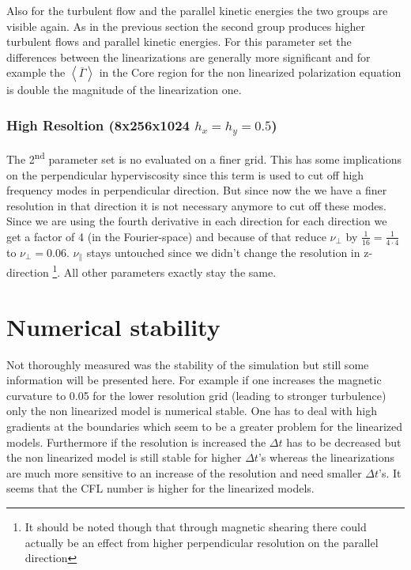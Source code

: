 \documentclass[master.tex]{subfiles}
\begin{document}
Also for the turbulent flow and the parallel kinetic energies the two groups are visible again. As in the previous section the second group produces higher turbulent flows and parallel kinetic energies.\newline
For this parameter set the differences between the linearizations are generally more significant and for example the $\left< \overline{\Gamma} \right>$ in the Core region for the non linearized polarization equation is double the magnitude of the linearization one.

\subsubsection{High Resoltion (8x256x1024 $h_x = h_y = 0.5$)}
The 2\textsuperscript{nd} parameter set is no evaluated on a finer grid. This has some implications on the perpendicular hyperviscosity since this term is used to cut off high frequency modes in perpendicular direction. But since now the we have a finer resolution in that direction it is not necessary anymore to cut off these modes. Since we are using the fourth derivative in each direction for each direction we get a factor of 4 (in the Fourier-space) and because of that reduce $\nu_\perp$ by $\frac{1}{16} = \frac{1}{4\cdot4}$ to $\nu_\perp = 0.06$. $\nu_\parallel$ stays untouched since we didn't change the resolution in z-direction \footnote{It should be noted though that through magnetic shearing there could actually be an effect from higher perpendicular resolution on the parallel direction}. All other parameters exactly stay the same.



\section{Numerical stability}
Not thoroughly measured was the stability of the simulation but still some information will be presented here. For example if one increases the magnetic curvature to 0.05 for the lower resolution grid (leading to stronger turbulence) only the non linearized model is numerical stable. One has to deal with high gradients at the boundaries which seem to be a greater problem for the linearized models. 
Furthermore if the resolution is increased the $\Delta t$ has to be decreased but the non linearized model is still stable for higher $\Delta t$'s whereas the linearizations are much more sensitive to an increase of the resolution and need smaller $\Delta t$'s. It seems that the \ac{CFL} number is higher for the linearized models.
\end{document}
